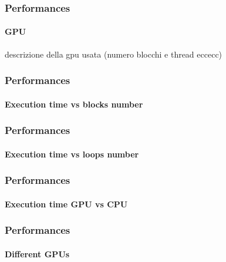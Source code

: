 \begin{frame}
\frametitle{Performances}
\framesubtitle{GPU}
\begin{center}
descrizione della gpu usata (numero blocchi e thread eccecc)
\end{center}
\end{frame}

\begin{frame}
\frametitle{Performances}
\framesubtitle{Execution time vs blocks number}
\begin{center}
\end{center}
\end{frame}

\begin{frame}
\frametitle{Performances}
\framesubtitle{Execution time vs loops number}
\begin{center}
\end{center}
\end{frame}

\begin{frame}
\frametitle{Performances}
\framesubtitle{Execution time GPU vs CPU}
\begin{center}
\end{center}
\end{frame}

\begin{frame}
\frametitle{Performances}
\framesubtitle{Different GPUs}
\begin{center}
\end{center}
\end{frame}
